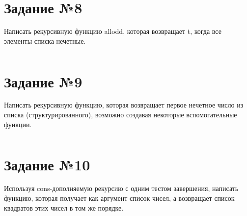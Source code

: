 \section{Задание №8}

Написать рекурсивную функцию allodd, которая возвращает t, когда все элементы
списка нечетные.

\vspace{4mm}
\begin{minipage}{0.92\linewidth}
\begin{lstlisting}
\end{lstlisting}
\end{minipage}

\section{Задание №9}

Написать рекурсивную функцию, которая возвращает первое нечетное число
из списка (структурированного), возможно создавая некоторые вспомогательные
функции.

\vspace{4mm}
\begin{minipage}{0.92\linewidth}
\begin{lstlisting}
\end{lstlisting}
\end{minipage}

\section{Задание №10}

Используя cons-дополняемую рекурсию с одним тестом завершения, написать функцию,
которая получает как аргумент список чисел, а возвращает список квадратов этих
чисел в том же порядке.

\vspace{4mm}
\begin{minipage}{0.92\linewidth}
\begin{lstlisting}
\end{lstlisting}
\end{minipage}

